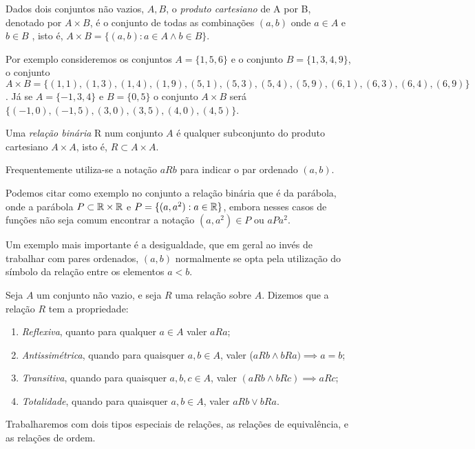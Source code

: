 \documentclass[../main.tex]{subfiles}
\begin{document}
\begin{defi}\label{agb-def-prodCart}
     Dados dois conjuntos não vazios, $A,B$, o \emph{produto cartesiano} de A por B, denotado por $A \times B$, é o conjunto de todas as combinações $(a,b)$ onde $a \in A$ e $b \in B$ , isto é, $A \times B = \{ (a,b) : a \in A \land b \in B \}$.
\end{defi}
Por exemplo consideremos os conjuntos $A = \{1,5,6\}$ e o conjunto $B = \{1,3,4,9\}$, o conjunto $A \times B = \{(1,1), (1,3), (1,4), (1,9), (5,1), (5,3), (5,4), (5,9), (6,1), (6,3), (6,4), (6,9)\}$. Já se $A = \{-1,3,4\}$ e $B = \{0,5\}$ o conjunto $A \times B$ será $\{(-1,0), (-1,5), (3,0), (3,5), (4,0), (4,5)\}$.

\begin{defi}\label{agb-def-relBin}
    Uma \emph{relação binária} R num conjunto $A$ é qualquer subconjunto do produto cartesiano $A \times A$, isto é, $R \subset A \times A$.
\end{defi}
Frequentemente utiliza-se a notação $aRb$ para indicar o par ordenado $(a,b)$.

Podemos citar como exemplo no conjunto \R a relação binária que é da parábola, onde a parábola $P \subset \mathbb{R} \times \mathbb{R}$ e $P = \{(a,a^2) : a \in \mathbb{R} \}$, embora nesses casos de funções não seja comum encontrar a notação $(a,a^2) \in P$ ou $a P a^2$.

Um exemplo mais importante é a desigualdade, que em geral ao invés de trabalhar com pares ordenados, $(a,b)$ normalmente se opta pela utilização do símbolo da relação entre os elementos $a<b$. 

\begin{defi}
    Seja $A$ um conjunto não vazio, e seja $R$ uma relação sobre $A$. Dizemos que a relação $R$ tem a propriedade:
    \begin{enumerate}[label=(\roman*)]
        \item \emph{Reflexiva}, quanto para qualquer $a \in A$ valer $aRa$;
        \item \emph{Antissimétrica}, quando para quaisquer $a,b \in A$, valer ($a R b \land bRa) \implies a = b$;
        \item \emph{Transitiva}, quando para quaisquer $a,b,c \in A$, valer $(aRb \land bRc) \implies aRc$;
        \item \emph{Totalidade}, quando para quaisquer $a,b \in A$, valer $aRb \lor bRa$.
    \end{enumerate}
\end{defi}

Trabalharemos com dois tipos especiais de relações, as relações de equivalência, e as relações de ordem.
\end{document}
